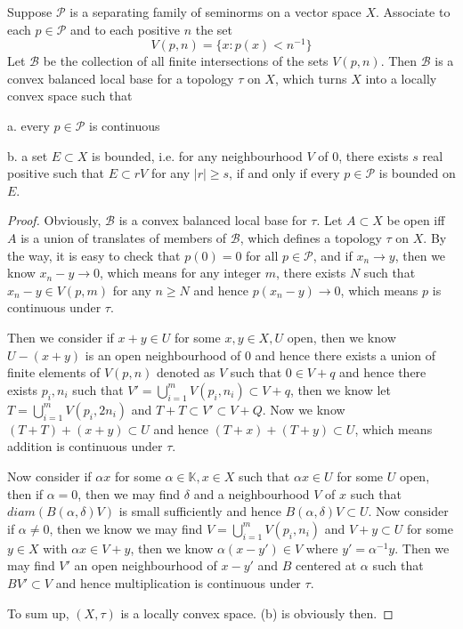 \documentclass[lang=en, color=blue, ]{elegantbook}
\begin{document}
\begin{theorem}
    Suppose $\mathscr{P}$ is a separating family of seminorms on a vector space $X$. Associate to each $p\in \mathcal{P}$ and to each positive $n$ the set
    \[V(p,n) = \{x:p(x)<n^{-1}\}\]
    Let $\mathscr{B}$ be the collection of all finite intersections of the sets $V(p,n)$. Then $\mathscr{B}$ is a convex balanced local base for a topology $\tau$ on $X$, which turns $X$ into a locally convex space such that\par
    a. every $p\in\mathcal{P}$ is continuous\par
    b. a set $E\subset X$ is bounded, i.e. for any neighbourhood $V$ of $0$, there exists $s$ real positive such that $E\subset rV$ for any $|r|\geq s$, if and only if every $p\in\mathcal{P}$ is bounded on $E$.
\end{theorem}
\begin{proof}\par
    Obviously, $\mathscr{B}$ is a convex balanced local base for $\tau$. Let $A\subset X$ be open iff $A$ is a union of translates of members of $\mathscr{B}$, which defines a topology $\tau$ on $X$. By the way, it is easy to check that $p(0) = 0$ for all $p\in\mathcal{P}$, and if $x_n \to y$, then we know $x_n - y \to 0$, which means for any integer $m$, there exists $N$ such that $x_n-y \in V(p,m)$ for any $n\geq N$ and hence $p(x_n-y) \to 0$, which means $p$ is continuous under $\tau$.\par
    Then we consider if $x+y \in U$ for some $x,y\in X, U$ open, then we know $U-(x+y)$ is an open neighbourhood of $0$ and hence there exists a union of finite elements of $V(p,n)$ denoted as $V$ such that $0 \in V+q$ and hence there exists $p_i,n_i$ such that $V' = \bigcup_{i=1}^m V(p_i,n_i) \subset V+q$, then we know let $T = \bigcup_{i=1}^m V(p_i,2n_i)$ and $T+T\subset V' \subset V+Q$. Now we know $(T+T)+(x+y)\subset U$ and hence $(T+x)+(T+y) \subset U$, which means addition is continuous under $\tau$.\par
    Now consider if $\alpha x$ for some $\alpha\in \mathbb{K}, x\in X$ such that $\alpha x \in U$ for some $U$ open, then if $\alpha = 0$, then we may find $\delta$ and a neighbourhood $V$ of $x$ such that $diam(B(\alpha,\delta) V)$ is small sufficiently and hence $B(\alpha,\delta) V \subset U$. Now consider if $\alpha \neq 0$, then we know we may find $V = \bigcup_{i=1}^m V(p_i,n_i)$ and $V+y\subset U$ for some $y\in X$ with $\alpha x \in V+y$, then we know $\alpha(x-y') \in V$ where $y' = \alpha^{-1}y$. Then we may find $V'$ an open neighbourhood of $x-y'$ and $B$ centered at $\alpha$ such that $BV'\subset V$ and hence multiplication is continuous under $\tau$.\par
    To sum up, $(X,\tau)$ is a locally convex space. (b) is obviously then. 
\end{proof}
\end{document}
